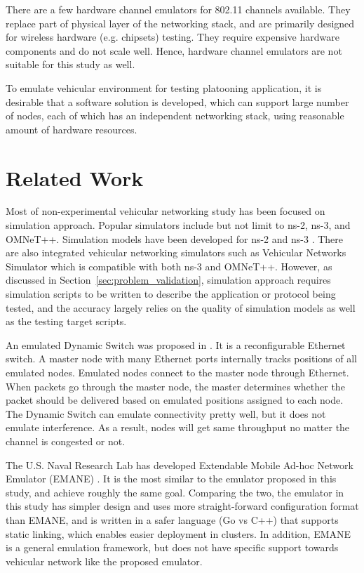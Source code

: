\documentclass[12pt]{report}
\begin{document}
There are a few hardware channel emulators for 802.11 channels available. They replace part of physical layer of the networking stack, and are primarily designed for wireless hardware (e.g. chipsets) testing. They require expensive hardware components and do not scale well. Hence, hardware channel emulators are not suitable for this study as well.

To emulate vehicular environment for testing platooning application, it is desirable that a software solution is developed, which can support large number of nodes, each of which has an independent networking stack, using reasonable amount of hardware resources.


\section{Related Work}

Most of non-experimental vehicular networking study has been focused on simulation approach. Popular simulators include but not limit to ns-2, ns-3\cite{henderson2008network}, and OMNeT++\cite{varga2008overview}. Simulation models have been developed for ns-2 \cite{Chen2006ns2} and ns-3 \cite{Arbabi2010ns3,benin2012ns3}. There are also integrated vehicular networking simulators such as Vehicular Networks Simulator \cite{fernandes2012} which is compatible with both ns-3 and OMNeT++. However, as discussed in Section~\ref{sec:problem_validation}, simulation approach requires simulation scripts to be written to describe the application or protocol being tested, and the accuracy largely relies on the quality of simulation models as well as the testing target scripts.

An emulated Dynamic Switch was proposed in \cite{lin2004mobile}. It is a reconfigurable Ethernet switch. A master node with many Ethernet ports internally tracks positions of all emulated nodes. Emulated nodes connect to the master node through Ethernet. When packets go through the master node, the master determines whether the packet should be delivered based on emulated positions assigned to each node. The Dynamic Switch can emulate connectivity pretty well, but it does not emulate interference. As a result, nodes will get same throughput no matter the channel is congested or not.

The U.S. Naval Research Lab has developed Extendable Mobile Ad-hoc Network Emulator (EMANE) \cite{EMANE}. It is the most similar to the emulator proposed in this study, and achieve roughly the same goal. Comparing the two, the emulator in this study has simpler design and uses more straight-forward configuration format than EMANE, and is written in a safer language (Go vs C++) that supports static linking, which enables easier deployment in clusters. In addition, EMANE is a general emulation framework, but does not have specific support towards vehicular network like the proposed emulator.
\end{document}
